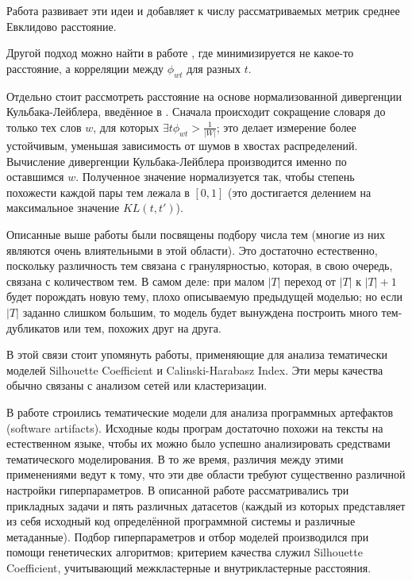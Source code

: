 Работа \cite{tang14look} развивает эти идеи и добавляет к числу рассматриваемых метрик среднее Евклидово расстояние. 

Другой подход можно найти в работе \cite{tan2010topic}, где минимизируется не какое-то расстояние, а корреляции между $\phi_{wt}$ для разных $t$.

Отдельно стоит рассмотреть расстояние на основе нормализованной дивергенции Кульбака-Лейблера, введённое в \cite{koltcov2014latent}. Сначала происходит сокращение словаря до только тех слов $w$, для которых $\exists t \phi_{wt} > \frac{1}{|W|}$; это делает измерение более устойчивым, уменьшая зависимость от шумов в хвостах распределений. Вычисление дивергенции Кульбака-Лейблера производится именно по оставшимся $w$. Полученное значение нормализуется так, чтобы степень похожести каждой пары тем лежала в $[0, 1]$ (это достигается делением на максимальное значение $KL(t, t')$). 

Описанные выше работы \cite{} \cite{} \cite{} были посвящены подбору числа тем (многие из них являются очень влиятельными в этой области). Это достаточно естественно, поскольку различность тем связана с гранулярностью, которая, в свою очередь, связана с количеством тем. В самом деле: при малом $|T|$ переход от $|T|$ к $|T|+1$ будет порождать новую тему, плохо описываемую предыдущей моделью; но если $|T|$ заданно слишком большим, то модель будет вынуждена построить много тем-дубликатов или тем, похожих друг на друга.

В этой связи стоит упомянуть работы, применяющие для анализа тематически моделей Silhouette Coefficient и Calinski-Harabasz Index. Эти меры качества обычно связаны с анализом сетей или кластеризации.

В работе \cite{panichella2013effectively} строились тематические модели для анализа программных артефактов (software artifacts). Исходные коды програм достаточно похожи на тексты на естественном языке, чтобы их можно было успешно анализировать средствами тематического моделирования. В то же время, различия между этими применениями ведут к тому, что эти две области требуют существенно различной настройки гиперпараметров. В описанной работе рассматривались три прикладных задачи и пять различных датасетов (каждый из которых представляет из себя исходный код определённой программной системы и различные метаданные). Подбор гиперпараметров и отбор моделей производился при помощи генетических алгоритмов; критерием качества служил Silhouette Coefficient, учитывающий межкластерные и внутрикластерные расстояния.

